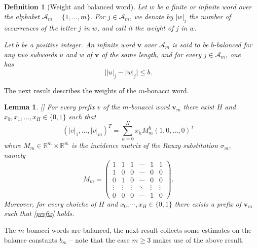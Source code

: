 \documentclass{amsart}
\newtheorem{lemma}[theorem]{Lemma}
\newtheorem{definition}[theorem]{Definition}
\newcommand{\RR}{\mathbb R}
\begin{document}
\begin{definition}[Weight and balanced word]
Let $w$ be a finite or infinite word over the alphabet $\mathcal A_m=\{1,\dots,m\}$.
For $j\in \mathcal A_m$, we denote by $|w|_j$ the number of occurrences of the letter $j$ in $w$, and call it the \emph{weight} of $j$ in $w$.

Let $b$ be a positive integer. An infinite word $\mathbf v$ over $\mathcal A_m$ is said to be $b$-\emph{balanced} for any two subwords $u$ and $w$ of $\mathbf v$ of the same length, and for every $j\in \mathcal A_m$, one has
\[
\bigl||u|_j - |w|_j\bigr| \leq b.
\]
\end{definition}
The next result describes the weights of the $m$-bonacci word. 
\begin{lemma}\label{l1bal}[\cite{balancetrib}]
For every prefix $v$ of the $m$-bonacci word $\mathbf v_m$ there exist $H$ and $x_0,x_1,\dots,x_H\in\{0,1\}$ such that 
\begin{equation}\label{prefix}(|v|_1,\dots,|v|_m)^T=\sum_{h=0}^H x_h M_m^h (1,0,\dots,0)^T \end{equation}
where $M_m\in \RR^m\times \RR^m$ is the incidence matrix of the Rauzy substitution $\sigma_m$, namely
\begin{equation}\label{Mm}M_{m}= 
\begin{pmatrix}
1 & 1 & 1 & \cdots & 1 & 1 \\
1 & 0 & 0 & \cdots & 0 & 0 \\
0 & 1 & 0 & \cdots & 0 & 0 \\
\vdots & \vdots & \vdots & \ddots & \vdots & \vdots \\
0 & 0 & 0 & \cdots & 1 & 0
\end{pmatrix}.
\end{equation}
Moreover, for every choiche of $H$ and $x_0,\cdots,x_H\in\{0,1\}$ there exists a prefix of $\mathbf v_m$ such that \eqref{prefix} holds. 
\end{lemma}

The $m$-bonacci words are balanced, the next result collects some estimates on the balance constants $b_m$ -- note that the case $m\geq 3$ makes use of the above result.
\end{document}
